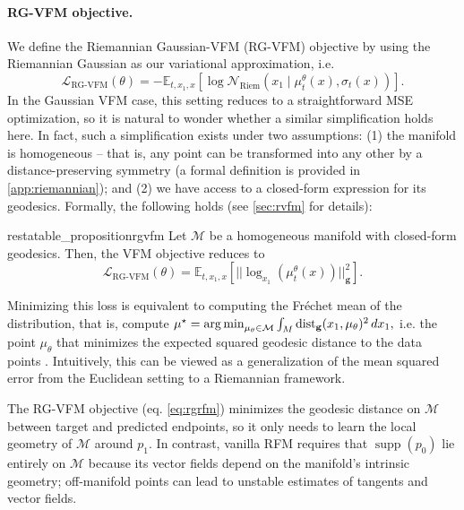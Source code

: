 \paragraph{RG-VFM objective.} We define the Riemannian Gaussian-VFM (RG-VFM) objective by using the Riemannian Gaussian as our variational approximation, i.e.
\begin{equation}
\mathcal{L}_{\text{RG-VFM}} (\theta) = -\mathbb{E}_{t,x_1,x}\left[\log \mathcal{N}_{\text{Riem}}(x_1 \mid \mu_t^{\theta}(x), \sigma_t(x))\right].
\end{equation} 
In the Gaussian VFM case, this setting reduces to a straightforward MSE optimization, so it is natural to wonder whether a similar simplification holds here. In fact, such a simplification exists under two assumptions: (1) the manifold is homogeneous -- that is, any point can be transformed into any other by a distance-preserving symmetry (a formal definition is provided in \cref{app:riemannian}); and (2) we have access to a closed-form expression for its geodesics. Formally, the following holds (see \cref{sec:rvfm} for details):
\begin{restatable}{restatable_proposition}{rgvfm}
Let $\mathcal{M}$ be a homogeneous manifold with closed-form geodesics. Then, the VFM objective reduces to
\begin{equation} \label{eq:rgrfm}
    \mathcal{L}_{\text{RG-VFM}} (\theta) = \mathbb{E}_{t,x_1,x}\left[ || \log_{x_1}(\mu_t^{\theta}(x)) ||_{\mathbf{g}}^2\right].
\end{equation}
\end{restatable}

Minimizing this loss is equivalent to computing the Fréchet mean of the distribution, that is, compute 
$\mu^{\star}= \operatorname*{arg\,min}_{\mu_{\theta}\in \mathcal{M}} \int_M \text{dist}_{\mathbf{g}}(x_1,\mu_{\theta})^2 \,d x_1,$ i.e. the point $\mu_{\theta}$ that minimizes the expected squared geodesic distance to the data points \citep{frechet1948elements}. Intuitively, this can be viewed as a generalization of the mean squared error from the Euclidean setting to a Riemannian framework.

The RG-VFM objective (eq. \ref{eq:rgrfm}) minimizes the geodesic distance on $\mathcal{M}$ between target and predicted endpoints, so it only needs to learn the local geometry of $\mathcal{M}$ around $p_1$. In contrast, vanilla RFM requires that $\operatorname{supp}(p_0)$ lie entirely on $\mathcal{M}$ because its vector fields depend on the manifold’s intrinsic geometry; off-manifold points can lead to unstable estimates of tangents and vector fields. 


